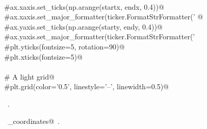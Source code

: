 \documentclass[10pt, english, oneside]{report}
\begin{document}
\begin{appendices}
\begin{flushleft}
\begin{list}{}{}
\mbox{}\verb@@\\
\mbox{}\verb@    #ax.xaxis.set_ticks(np.arange(startx, endx, 0.4))@\\
\mbox{}\verb@    #ax.xaxis.set_major_formatter(ticker.FormatStrFormatter('%0.1f'))@\\
\mbox{}\verb@     @\\
\mbox{}\verb@    #ax.yaxis.set_ticks(np.arange(starty, endy, 0.4))@\\
\mbox{}\verb@    #ax.yaxis.set_major_formatter(ticker.FormatStrFormatter('%0.1f'))@\\
\mbox{}\verb@@\\
\mbox{}\verb@    #plt.yticks(fontsize=5, rotation=90)@\\
\mbox{}\verb@    #plt.xticks(fontsize=5)@\\
\mbox{}\verb@@\\
\mbox{}\verb@    # A light grid@\\
\mbox{}\verb@    #plt.grid(color='0.5', linestyle='--', linewidth=0.5)@\\
\mbox{}\verb@@{\NWsep}
\end{list}
\vspace{-1.5ex}
\footnotesize
\begin{list}{}{\setlength{\itemsep}{-\parsep}\setlength{\itemindent}{-\leftmargin}}
\item \NWtxtMacroRefIn\ .
\item \NWtxtIdentsUsed\nobreak\  \verb@extract_coordinates@\nobreak\ .
\item{}
\end{list}
\vspace{4ex}
\end{flushleft}





\end{appendices}
\listoftodos
\end{document}
